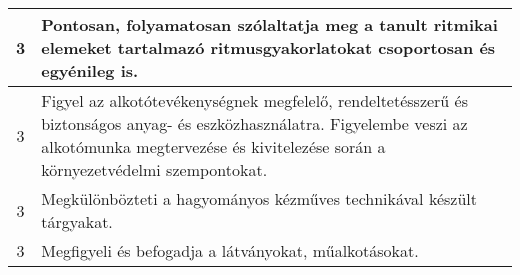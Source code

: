 \begin{longtable}{c | p{12cm} }
                                
                                          3 &  Pontosan, folyamatosan szólaltatja meg a tanult ritmikai elemeket tartalmazó ritmusgyakorlatokat csoportosan és egyénileg is. \\ \hline
                                          3 &  Figyel az alkotótevékenységnek megfelelő, rendeltetésszerű és biztonságos anyag- és eszközhasználatra. Figyelembe veszi az alkotómunka megtervezése és kivitelezése során a környezetvédelmi szempontokat. \\ \hline
                                          3 &  Megkülönbözteti a hagyományos kézműves technikával készült tárgyakat. \\ \hline
                                          3 &  Megfigyeli és befogadja a látványokat, műalkotásokat. \\ \hline
                                      

\end{longtable}

